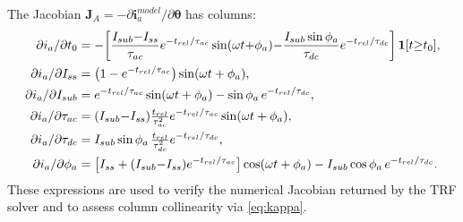 \documentclass[journal, twoside, 10pt]{IEEEtran}
\newcommand{\vect}[1]{\bm{#1}}
\newcommand{\mat}[1]{\mathbf{#1}}
\begin{document}
The Jacobian $\mat{J}_A = -\partial \vect{i}_a^{model}/\partial\vect{\theta}$
has columns:
\begin{align}
  \partial i_a/\partial t_0 &= -\!\left[
    \frac{I_{sub}{-}I_{ss}}{\tau_{ac}}e^{-t_{rel}/\tau_{ac}}\sin(\omega t{+}\phi_a)
    {-}\frac{I_{sub}\sin\phi_a}{\tau_{dc}}e^{-t_{rel}/\tau_{dc}}
  \right]\mathbf{1}[t{\geq} t_0],\notag\\
  \partial i_a/\partial I_{ss} &= \bigl(1 - e^{-t_{rel}/\tau_{ac}}\bigr)\sin(\omega t+\phi_a),\notag\\
  \partial i_a/\partial I_{sub} &= e^{-t_{rel}/\tau_{ac}}\sin(\omega t+\phi_a)
    - \sin\phi_a\,e^{-t_{rel}/\tau_{dc}},\notag\\
  \partial i_a/\partial \tau_{ac} &= (I_{sub}{-}I_{ss})
    \tfrac{t_{rel}}{\tau_{ac}^2}e^{-t_{rel}/\tau_{ac}}\sin(\omega t+\phi_a),\notag\\
  \partial i_a/\partial \tau_{dc} &= I_{sub}\sin\phi_a\,
    \tfrac{t_{rel}}{\tau_{dc}^2}e^{-t_{rel}/\tau_{dc}},\notag\\
  \partial i_a/\partial \phi_a &= \bigl[I_{ss}+(I_{sub}{-}I_{ss})
    e^{-t_{rel}/\tau_{ac}}\bigr]\cos(\omega t+\phi_a)
    - I_{sub}\cos\phi_a\,e^{-t_{rel}/\tau_{dc}}.\notag
\end{align}
These expressions are used to verify the numerical Jacobian returned by the
TRF solver and to assess column collinearity via \eqref{eq:kappa}.


\end{document}
